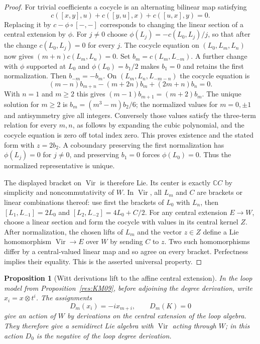 \documentclass[11pt,oneside,openany]{book}
\newtheorem{proposition}[theorem]{Proposition}
\theoremstyle{definition}
\theoremstyle{remark}
\begin{document}
\begin{proof}
For trivial coefficients a cocycle is an alternating bilinear map
satisfying
\[
 c([x,y],u)+c([y,u],x)+c([u,x],y)=0 .
\]
Replacing it by \(c-\phi\circ[-,-]\) corresponds to changing
the linear section of a central extension by \(\phi\).
For \(j\ne0\) choose
\(\phi(L_j)=-c(L_0,L_j)/j\), so that after the change
\(c(L_0,L_j)=0\) for every \(j\). The cocycle equation on
\((L_0,L_m,L_n)\) now gives
\((m+n)c(L_m,L_n)=0\). Set \(b_m=c(L_m,L_{-m})\).
A further change with \(\phi\) supported at \(L_0\) and
\(\phi(L_0)=b_1/2\) makes \(b_1=0\) and retains the first
normalization. Then \(b_{-m}=-b_m\). On
\((L_m,L_n,L_{-m-n})\) the cocycle equation is
\[
 (m-n)b_{m+n}-(m+2n)b_m+(2m+n)b_n=0 .
\]
With \(n=1\) and \(m\ge2\) this gives
\((m-1)b_{m+1}=(m+2)b_m\). The unique solution for \(m\ge2\)
is \(b_m=(m^3-m)b_2/6\); the normalized values for
\(m=0,\pm1\) and antisymmetry give all integers. Conversely
those values satisfy the three-term relation for every \(m,n\),
as follows by expanding the cubic polynomial, and the cocycle
equation is zero off total index zero. This proves existence
and the stated form with \(z=2b_2\). A coboundary preserving
the first normalization has \(\phi(L_j)=0\) for \(j\ne0\),
and preserving \(b_1=0\) forces \(\phi(L_0)=0\).
Thus the normalized representative is unique.

The displayed bracket on \(\operatorname{Vir}\) is therefore
Lie. Its center is exactly \(\mathbb C C\) by simplicity and
noncommutativity of \(W\). In \(\operatorname{Vir}\), all
\(L_m\) and \(C\) are brackets or linear combinations thereof:
use first the brackets of \(L_0\) with \(L_n\), then
\([L_1,L_{-1}]=2L_0\) and
\([L_2,L_{-2}]=4L_0+C/2\). For any central extension
\(E\to W\), choose a linear section and form the cocycle with
values in its central kernel \(Z\).
After normalization, the chosen lifts of \(L_m\) and the vector
\(z\in Z\) define a Lie homomorphism
\(\operatorname{Vir}\to E\) over \(W\) by sending \(C\) to \(z\).
Two such homomorphisms differ by a central-valued linear map
and so agree on every bracket. Perfectness implies their equality.
This is the asserted universal property.
\end{proof}

\begin{proposition}[Witt derivations lift to the affine central extension]
\label{res:KM12}
In the loop model from Proposition~\ref{res:KM09}, before adjoining
the degree derivation, write \(x_i=x\otimes t^i\).
The assignments
\[
 D_m(x_i)=-i x_{m+i},\qquad D_m(K)=0
\]
give an action of \(W\) by derivations on the central extension
of the loop algebra. They therefore give a semidirect Lie algebra
with \(\operatorname{Vir}\) acting through \(W\); in this action
\(D_0\) is the negative of the loop degree derivation.
\end{proposition}
\end{document}
